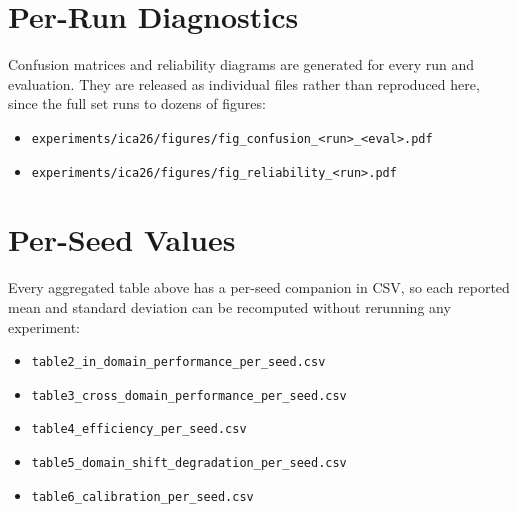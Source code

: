 \documentclass[runningheads]{llncs}
\begin{document}
\section{Per-Run Diagnostics}

Confusion matrices and reliability diagrams are generated for every run and
evaluation. They are released as individual files rather than reproduced here,
since the full set runs to dozens of figures:

\begin{itemize}
\item \texttt{experiments/ica26/figures/fig\_confusion\_<run>\_<eval>.pdf}
\item \texttt{experiments/ica26/figures/fig\_reliability\_<run>.pdf}
\end{itemize}

\section{Per-Seed Values}

Every aggregated table above has a per-seed companion in CSV, so each reported
mean and standard deviation can be recomputed without rerunning any experiment:

\begin{itemize}
\item \texttt{table2\_in\_domain\_performance\_per\_seed.csv}
\item \texttt{table3\_cross\_domain\_performance\_per\_seed.csv}
\item \texttt{table4\_efficiency\_per\_seed.csv}
\item \texttt{table5\_domain\_shift\_degradation\_per\_seed.csv}
\item \texttt{table6\_calibration\_per\_seed.csv}
\end{itemize}
\end{document}

